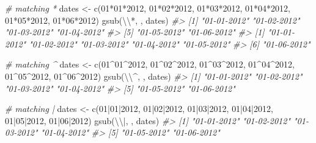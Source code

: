 \documentclass[
]{book}
\newenvironment{Shaded}{\begin{snugshade}}{\end{snugshade}}
\newcommand{\CommentTok}[1]{\textcolor[rgb]{0.56,0.35,0.01}{\textit{#1}}}
\newcommand{\FunctionTok}[1]{\textcolor[rgb]{0.00,0.00,0.00}{#1}}
\newcommand{\NormalTok}[1]{#1}
\newcommand{\OtherTok}[1]{\textcolor[rgb]{0.56,0.35,0.01}{#1}}
\newcommand{\SpecialCharTok}[1]{\textcolor[rgb]{0.00,0.00,0.00}{#1}}
\newcommand{\StringTok}[1]{\textcolor[rgb]{0.31,0.60,0.02}{#1}}
\begin{document}
\begin{Shaded}
\begin{Highlighting}[]
\CommentTok{\# matching *}
\NormalTok{dates }\OtherTok{\textless{}{-}} 
  \FunctionTok{c}\NormalTok{(}\StringTok{\textquotesingle{}01*01*2012\textquotesingle{}}\NormalTok{, }\StringTok{\textquotesingle{}01*02*2012\textquotesingle{}}\NormalTok{, }\StringTok{\textquotesingle{}01*03*2012\textquotesingle{}}\NormalTok{, }\StringTok{\textquotesingle{}01*04*2012\textquotesingle{}}\NormalTok{, }\StringTok{\textquotesingle{}01*05*2012\textquotesingle{}}\NormalTok{, }\StringTok{\textquotesingle{}01*06*2012\textquotesingle{}}\NormalTok{)}
\FunctionTok{gsub}\NormalTok{(}\StringTok{\textquotesingle{}}\SpecialCharTok{\textbackslash{}\textbackslash{}}\StringTok{*\textquotesingle{}}\NormalTok{, }\StringTok{\textquotesingle{}{-}\textquotesingle{}}\NormalTok{, dates)}
\CommentTok{\#\textgreater{} [1] "01{-}01{-}2012" "01{-}02{-}2012" "01{-}03{-}2012" "01{-}04{-}2012"}
\CommentTok{\#\textgreater{} [5] "01{-}05{-}2012" "01{-}06{-}2012"}
\CommentTok{\#\textgreater{} [1] "01{-}01{-}2012" "01{-}02{-}2012" "01{-}03{-}2012" "01{-}04{-}2012" "01{-}05{-}2012"}
\CommentTok{\#\textgreater{} [6] "01{-}06{-}2012"}

\CommentTok{\# matching \^{}}
\NormalTok{dates }\OtherTok{\textless{}{-}} 
  \FunctionTok{c}\NormalTok{(}\StringTok{\textquotesingle{}01\^{}01\^{}2012\textquotesingle{}}\NormalTok{, }\StringTok{\textquotesingle{}01\^{}02\^{}2012\textquotesingle{}}\NormalTok{, }\StringTok{\textquotesingle{}01\^{}03\^{}2012\textquotesingle{}}\NormalTok{, }\StringTok{\textquotesingle{}01\^{}04\^{}2012\textquotesingle{}}\NormalTok{, }\StringTok{\textquotesingle{}01\^{}05\^{}2012\textquotesingle{}}\NormalTok{, }\StringTok{\textquotesingle{}01\^{}06\^{}2012\textquotesingle{}}\NormalTok{)}
\FunctionTok{gsub}\NormalTok{(}\StringTok{\textquotesingle{}}\SpecialCharTok{\textbackslash{}\textbackslash{}}\StringTok{\^{}\textquotesingle{}}\NormalTok{, }\StringTok{\textquotesingle{}{-}\textquotesingle{}}\NormalTok{, dates)}
\CommentTok{\#\textgreater{} [1] "01{-}01{-}2012" "01{-}02{-}2012" "01{-}03{-}2012" "01{-}04{-}2012"}
\CommentTok{\#\textgreater{} [5] "01{-}05{-}2012" "01{-}06{-}2012"}

\CommentTok{\# matching |}
\NormalTok{dates }\OtherTok{\textless{}{-}} 
  \FunctionTok{c}\NormalTok{(}\StringTok{\textquotesingle{}01|01|2012\textquotesingle{}}\NormalTok{, }\StringTok{\textquotesingle{}01|02|2012\textquotesingle{}}\NormalTok{, }\StringTok{\textquotesingle{}01|03|2012\textquotesingle{}}\NormalTok{, }\StringTok{\textquotesingle{}01|04|2012\textquotesingle{}}\NormalTok{, }\StringTok{\textquotesingle{}01|05|2012\textquotesingle{}}\NormalTok{, }\StringTok{\textquotesingle{}01|06|2012\textquotesingle{}}\NormalTok{)}
\FunctionTok{gsub}\NormalTok{(}\StringTok{\textquotesingle{}}\SpecialCharTok{\textbackslash{}\textbackslash{}}\StringTok{|\textquotesingle{}}\NormalTok{, }\StringTok{\textquotesingle{}{-}\textquotesingle{}}\NormalTok{, dates)}
\CommentTok{\#\textgreater{} [1] "01{-}01{-}2012" "01{-}02{-}2012" "01{-}03{-}2012" "01{-}04{-}2012"}
\CommentTok{\#\textgreater{} [5] "01{-}05{-}2012" "01{-}06{-}2012"}


\end{Highlighting}
\end{Shaded}
\end{document}
